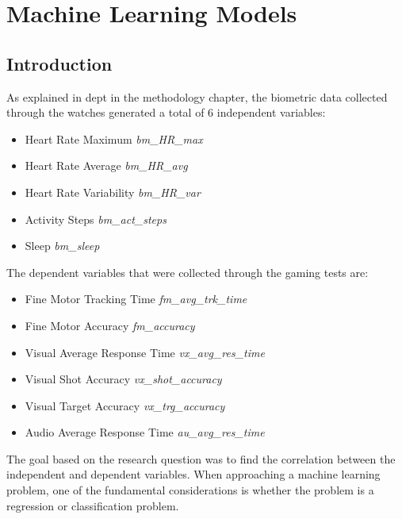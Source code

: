 \chapter{Machine Learning Models}

\section{Introduction}
As explained in dept in the methodology chapter, the biometric data collected through the watches generated a total of 6 independent variables:

\begin{itemize}
    \item Heart Rate Maximum \textit{bm\_HR\_max}
    \item Heart Rate Average \textit{bm\_HR\_avg}
    \item Heart Rate Variability \textit{bm\_HR\_var}
    \item Activity Steps \textit{bm\_act\_steps}
    \item Sleep \textit{bm\_sleep}
\end{itemize}

The dependent variables that were collected through the gaming tests are:

\begin{itemize}
    \item Fine Motor Tracking Time \textit{fm\_avg\_trk\_time}
    \item Fine Motor Accuracy \textit{fm\_accuracy}
    \item Visual Average Response Time \textit{vx\_avg\_res\_time}
    \item Visual Shot Accuracy \textit{vx\_shot\_accuracy}
    \item Visual Target Accuracy \textit{vx\_trg\_accuracy}
    \item Audio Average Response Time \textit{au\_avg\_res\_time}
\end{itemize}

The goal based on the research question was to find the correlation between the independent and dependent variables. When approaching a machine learning problem, one of the fundamental
considerations is whether the problem is a regression or classification problem. 


